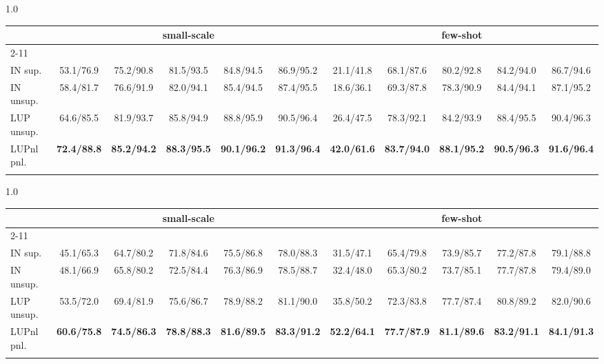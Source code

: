 \documentclass[10pt,twocolumn,letterpaper]{article}
\begin{document}
\begin{table*}[h]
\setlength{\tabcolsep}{1.7mm}
\small
    \begin{subtable}[h]{1.0\textwidth}
        \centering
        \begin{tabular}{l|ccccc|ccccc}
        \shline
        \multirow{2}{*}{pre-train} & \multicolumn{5}{c|}{small-scale} & \multicolumn{5}{c}{few-shot} \\ \cline{2-11} &  &  &  &  &  &  &  &  &  &  \\ \hline
        IN sup.    & 53.1/76.9 & 75.2/90.8 & 81.5/93.5 & 84.8/94.5 & 86.9/95.2 & 21.1/41.8 & 68.1/87.6 & 80.2/92.8 & 84.2/94.0 & 86.7/94.6 \\
        IN unsup.  & 58.4/81.7 & 76.6/91.9 & 82.0/94.1 & 85.4/94.5 & 87.4/95.5 & 18.6/36.1 & 69.3/87.8 & 78.3/90.9 & 84.4/94.1 & 87.1/95.2 \\
        LUP unsup. & 64.6/85.5 & 81.9/93.7 & 85.8/94.9 & 88.8/95.9 & 90.5/96.4 & 26.4/47.5 & 78.3/92.1 & 84.2/93.9 & 88.4/95.5 & 90.4/96.3 \\
        \hline
        LUPnl pnl. & \textbf{72.4/88.8} & \textbf{85.2/94.2} & \textbf{88.3/95.5} & \textbf{90.1/96.2} & \textbf{91.3/96.4} & \textbf{42.0/61.6} & \textbf{83.7/94.0} & \textbf{88.1/95.2} & \textbf{90.5/96.3} & \textbf{91.6/96.4} \\
        \shline
    \end{tabular}
\caption{Market1501}
    \label{tab:sd-fw-market}
    \end{subtable}
    
   \begin{subtable}[h]{1.0\textwidth}
        \centering
        \begin{tabular}{l|ccccc|ccccc}
        \shline
        \multirow{2}{*}{pre-train} & \multicolumn{5}{c|}{small-scale} & \multicolumn{5}{c}{few-shot} \\ \cline{2-11} &  &  &  &  &  &  &  &  &  &  \\ \hline
        IN sup.    & 45.1/65.3 & 64.7/80.2 & 71.8/84.6 & 75.5/86.8 & 78.0/88.3 & 31.5/47.1 & 65.4/79.8 & 73.9/85.7 & 77.2/87.8 & 79.1/88.8 \\ 
        IN unsup.  & 48.1/66.9 & 65.8/80.2 & 72.5/84.4 & 76.3/86.9 & 78.5/88.7 & 32.4/48.0 & 65.3/80.2 & 73.7/85.1 & 77.7/87.8 & 79.4/89.0 \\
        LUP unsup. & 53.5/72.0 & 69.4/81.9 & 75.6/86.7 & 78.9/88.2 & 81.1/90.0 & 35.8/50.2 & 72.3/83.8 & 77.7/87.4 & 80.8/89.2 & 82.0/90.6 \\
        \hline
        LUPnl pnl. & \textbf{60.6/75.8} & \textbf{74.5/86.3} & \textbf{78.8/88.3} & \textbf{81.6/89.5} & \textbf{83.3/91.2} & \textbf{52.2/64.1} & \textbf{77.7/87.9} & \textbf{81.1/89.6} & \textbf{83.2/91.1} & \textbf{84.1/91.3} \\
        \shline
    \end{tabular}
\caption{DukeMTMC}
    \label{tab:sd-fw-duke}
    \end{subtable}
    

\end{table*}
\end{document}
